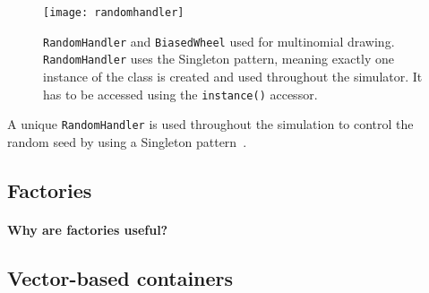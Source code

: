 \begin{figure}[!h]
  \centering
  \texttt{[image: randomhandler]}
  \caption{\texttt{RandomHandler} and \texttt{BiasedWheel} used for multinomial drawing. \texttt{RandomHandler} uses the Singleton pattern, meaning exactly one instance of the class is created and used throughout the simulator. It has to be accessed using the \texttt{instance()} accessor.}
  \label{fig:random_handler}
\end{figure}

A unique \texttt{RandomHandler} is used throughout the simulation to control the random seed by using a Singleton pattern~.

\subsection{Factories}

\paragraph{Why are factories useful?}

\subsection{Vector-based containers}
